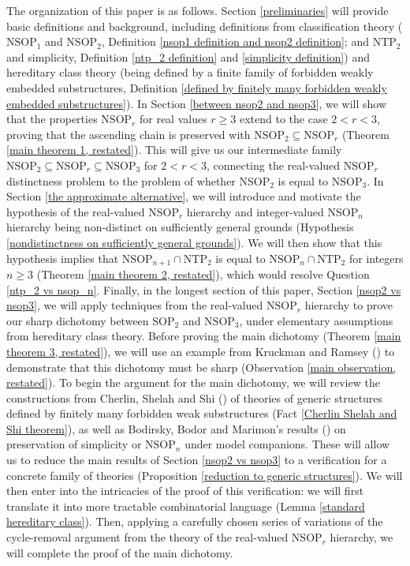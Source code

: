 \documentclass{amsart}
\theoremstyle{definition}
\theoremstyle{remark}
\numberwithin{equation}{section}
\begin{document}
The organization of this paper is as follows. Section \ref{preliminaries} will provide basic definitions and background, including definitions from classification theory ($\mathrm{NSOP}_{1}$ and $\mathrm{NSOP}_{2}$, Definition \ref{nsop1 definition and nsop2 definition}; and $\mathrm{NTP}_{2}$ and simplicity, Definition \ref{ntp_2 definition} and \ref{simplicity definition}) and hereditary class theory (being defined by a finite family of forbidden weakly embedded substructures, Definition \ref{defined by finitely many forbidden weakly embedded substructures}). In Section \ref{between nsop2 and nsop3}, we will show that the properties $\mathrm{NSOP}_{r}$ for real values $r \geq 3$ extend to the case $2 < r < 3$, proving that the ascending chain is preserved with $\mathrm{NSOP}_{2} \subseteq \mathrm{NSOP}_{r}$ (Theorem \ref{main theorem 1, restated}). This will give us our intermediate family $\mathrm{NSOP}_{2} \subseteq \mathrm{NSOP}_{r} \subseteq \mathrm{NSOP}_{3}$ for $2 < r <3$, connecting the real-valued $\mathrm{NSOP}_{r}$ distinctness problem to the problem of whether $\mathrm{NSOP}_{2}$ is equal to $\mathrm{NSOP}_{3}$. In Section \ref{the approximate alternative}, we will introduce and motivate the hypothesis of the real-valued $\mathrm{NSOP}_{r}$ hierarchy and integer-valued $\mathrm{NSOP}_{n}$ hierarchy being non-distinct on sufficiently general grounds (Hypothesis \ref{nondistinctness on sufficiently general grounds}). We will then show that this hypothesis implies that $\mathrm{NSOP}_{n+1} \cap \mathrm{NTP}_{2}$ is equal to $\mathrm{NSOP}_{n} \cap \mathrm{NTP}_{2}$ for integers $n \geq 3$ (Theorem \ref{main theorem 2, restated}), which would resolve Question \ref{ntp_2 vs nsop_n}. Finally, in the longest section of this paper, Section \ref{nsop2 vs nsop3}, we will apply techniques from the real-valued $\mathrm{NSOP}_{r}$ hierarchy to prove our sharp dichotomy between $\mathrm{SOP}_{2}$ and $\mathrm{NSOP}_{3}$, under elementary assumptions from hereditary class theory. Before proving the main dichotomy (Theorem \ref{main theorem 3, restated}), we will use an example from Kruckman and Ramsey (\cite{KR17}) to demonstrate that this dichotomy must be sharp (Observation \ref{main observation, restated}). To begin the argument for the main dichotomy, we will review the constructions from Cherlin, Shelah and Shi (\cite{CSS99}) of theories of generic structures defined by finitely many forbidden weak substructures (Fact \ref{Cherlin Shelah and Shi theorem}), as well as Bodirsky, Bodor and Marimon's results (\cite{BBM25}) on preservation of simplicity or $\mathrm{NSOP}_{n}$ under model companions. These will allow us to reduce the main results of Section \ref{nsop2 vs nsop3} to a verification for a concrete family of theories (Proposition \ref{reduction to generic structures}). We will then enter into the intricacies of the proof of this verification: we will first translate it into more tractable combinatorial language (Lemma \ref{standard hereditary class}). Then, applying a carefully chosen series of variations of the cycle-removal argument from the theory of the real-valued $\mathrm{NSOP}_{r}$ hierarchy, we will complete the proof of the main dichotomy.
\end{document}
